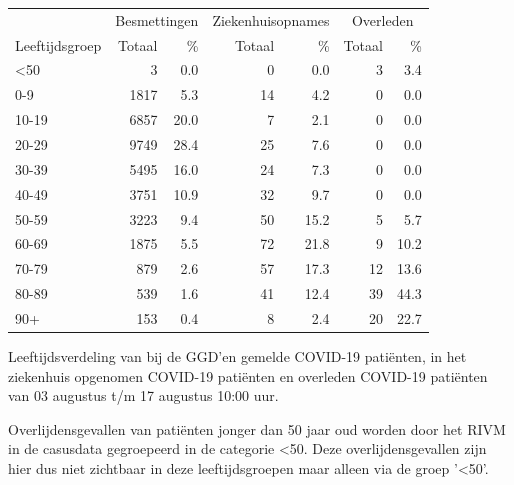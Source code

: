 \documentclass[
  english,
  man,floatsintext]{apa6}
\begin{document}
\begin{table}
\centering\begingroup\fontsize{11}{13}\selectfont

\begin{threeparttable}
\begin{tabular}{lrrrrrr}
\toprule
\multicolumn{1}{c}{ } & \multicolumn{2}{c}{Besmettingen} & \multicolumn{2}{c}{Ziekenhuisopnames} & \multicolumn{2}{c}{Overleden} \\
\cmidrule(l{3pt}r{3pt}){2-3} \cmidrule(l{3pt}r{3pt}){4-5} \cmidrule(l{3pt}r{3pt}){6-7}
Leeftijdsgroep & Totaal & \% & Totaal & \% & Totaal & \%\\
\midrule
<50 & 3 & 0.0 & 0 & 0.0 & 3 & 3.4\\
0-9 & 1817 & 5.3 & 14 & 4.2 & 0 & 0.0\\
10-19 & 6857 & 20.0 & 7 & 2.1 & 0 & 0.0\\
20-29 & 9749 & 28.4 & 25 & 7.6 & 0 & 0.0\\
30-39 & 5495 & 16.0 & 24 & 7.3 & 0 & 0.0\\
40-49 & 3751 & 10.9 & 32 & 9.7 & 0 & 0.0\\
50-59 & 3223 & 9.4 & 50 & 15.2 & 5 & 5.7\\
60-69 & 1875 & 5.5 & 72 & 21.8 & 9 & 10.2\\
70-79 & 879 & 2.6 & 57 & 17.3 & 12 & 13.6\\
80-89 & 539 & 1.6 & 41 & 12.4 & 39 & 44.3\\
90+ & 153 & 0.4 & 8 & 2.4 & 20 & 22.7\\
\bottomrule
\end{tabular}
\begin{tablenotes}
\item[1] Leeftijdsverdeling van bij de GGD’en gemelde COVID-19 patiënten, in het ziekenhuis opgenomen COVID-19 patiënten en overleden COVID-19 patiënten van 03 augustus t/m 17 augustus 10:00 uur.
\item[2] Overlijdensgevallen van patiënten jonger dan 50 jaar oud worden door het RIVM in de casusdata gegroepeerd in de categorie <50. Deze overlijdensgevallen zijn hier dus niet zichtbaar in deze leeftijdsgroepen maar alleen via de groep '<50'.
\end{tablenotes}
\end{threeparttable}
\endgroup{}
\end{table}

\newpage
\end{document}
